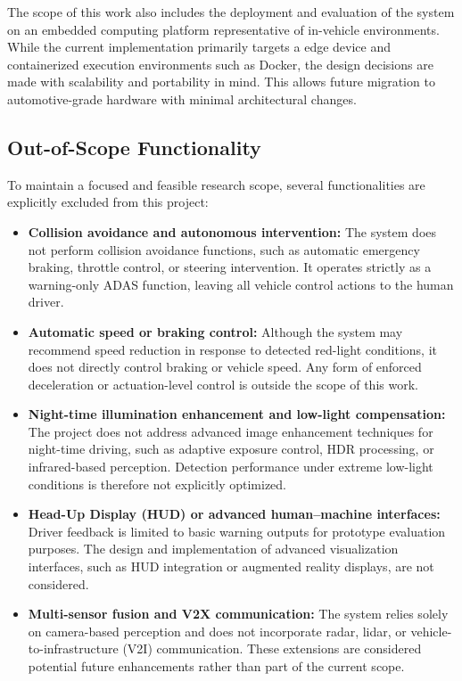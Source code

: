 The scope of this work also includes the deployment and evaluation of the system on an embedded computing platform representative of in-vehicle environments. While the current implementation primarily targets a edge device and containerized execution environments such as Docker, the design decisions are made with scalability and portability in mind. This allows future migration to automotive-grade hardware with minimal architectural changes.

\subsection{Out-of-Scope Functionality}

To maintain a focused and feasible research scope, several functionalities are explicitly excluded from this project:

\begin{itemize}
    \item \textbf{Collision avoidance and autonomous intervention:}  
    The system does not perform collision avoidance functions, such as automatic emergency braking, throttle control, or steering intervention. It operates strictly as a warning-only ADAS function, leaving all vehicle control actions to the human driver.

    \item \textbf{Automatic speed or braking control:}  
    Although the system may recommend speed reduction in response to detected red-light conditions, it does not directly control braking or vehicle speed. Any form of enforced deceleration or actuation-level control is outside the scope of this work.

    \item \textbf{Night-time illumination enhancement and low-light compensation:}  
    The project does not address advanced image enhancement techniques for night-time driving, such as adaptive exposure control, HDR processing, or infrared-based perception. Detection performance under extreme low-light conditions is therefore not explicitly optimized.

    \item \textbf{Head-Up Display (HUD) or advanced human–machine interfaces:}  
    Driver feedback is limited to basic warning outputs for prototype evaluation purposes. The design and implementation of advanced visualization interfaces, such as HUD integration or augmented reality displays, are not considered.

    \item \textbf{Multi-sensor fusion and V2X communication:}  
    The system relies solely on camera-based perception and does not incorporate radar, lidar, or vehicle-to-infrastructure (V2I) communication. These extensions are considered potential future enhancements rather than part of the current scope.
\end{itemize}

